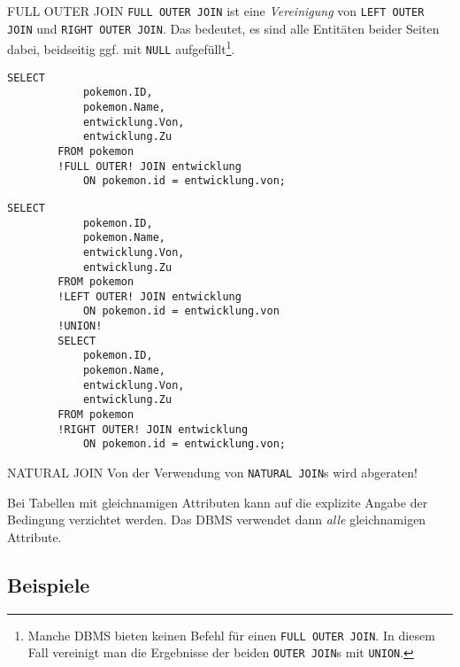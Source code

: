 \begin{sql}{FULL OUTER JOIN}
    \texttt{FULL OUTER JOIN} ist eine \emph{Vereinigung} von \texttt{LEFT OUTER JOIN} und \texttt{RIGHT OUTER JOIN}.
    Das bedeutet, es sind alle Entitäten beider Seiten dabei, beidseitig ggf. mit \texttt{NULL} aufgefüllt\footnote{
    Manche DBMS bieten keinen Befehl für einen \texttt{FULL OUTER JOIN}.
    In diesem Fall vereinigt man die Ergebnisse der beiden \texttt{OUTER JOIN}s mit \texttt{UNION}.}.

    \begin{lstlisting}[style=SqlInputStyle]
        SELECT
            pokemon.ID,
            pokemon.Name,
            entwicklung.Von,
            entwicklung.Zu
        FROM pokemon
        !FULL OUTER! JOIN entwicklung
            ON pokemon.id = entwicklung.von;
    \end{lstlisting}

    \begin{lstlisting}[style=SqlInputStyle]
        SELECT
            pokemon.ID,
            pokemon.Name,
            entwicklung.Von,
            entwicklung.Zu
        FROM pokemon
        !LEFT OUTER! JOIN entwicklung
            ON pokemon.id = entwicklung.von
        !UNION!
        SELECT
            pokemon.ID,
            pokemon.Name,
            entwicklung.Von,
            entwicklung.Zu
        FROM pokemon
        !RIGHT OUTER! JOIN entwicklung
            ON pokemon.id = entwicklung.von;
    \end{lstlisting}
\end{sql}

\begin{bonus}{NATURAL JOIN}
    Von der Verwendung von \texttt{NATURAL JOIN}s wird abgeraten!

    Bei Tabellen mit gleichnamigen Attributen kann auf die explizite Angabe der Bedingung verzichtet werden.
    Das DBMS verwendet dann \emph{alle} gleichnamigen Attribute.
\end{bonus}

\subsection{Beispiele}

